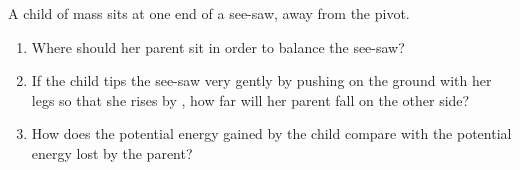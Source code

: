 
\begin{problem}[Robin6]
{A child of mass  sits at one end of a see-saw,  away from the pivot.
\begin{enumerate}
	\item Where should her  parent sit in order to balance the see-saw?
	\item If the child tips the see-saw very gently by pushing on the ground with her legs so that she rises by , how far will her parent fall on the other side?
	\item How does the potential energy gained by the child compare with the potential energy lost by the parent?
\end{enumerate}
}
{}
{}
\end{problem}